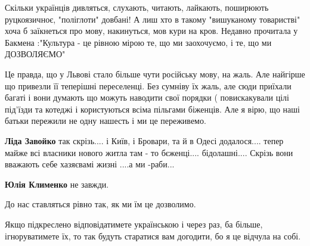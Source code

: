 \begin{itemize}
 

Скільки українців дивляться, слухають, читають, лайкають, поширюють
руцкоязичноє, "поліглоти" довбані! А лиш хто в такому "вишуканому товаристві"
хоча б заїкнеться про мову, накинуться, мов кури на кров. Недавно прочитала у
Бакмена :"Культура - це рівною мірою те, що ми заохочуємо, і те, що ми
ДОЗВОЛЯЄМО"

 

Це правда, що у Львові стало більше чути російську мову, на жаль. Але найгірше
що привезли її теперішні переселенці. Без сумніву їх жаль, але сюди приїхали
багаті і вони думають що можуть наводити свої порядки ( повискакували цілі
під'їзди та котеджі і користуються всіма пільгами біженців. Але я вірю, що наші
батьки пережили не одну нашесть і ми це переживемо.

\begin{itemize}
 
\textbf{Ліда Завойко} так скрізь.... і Київ, і Бровари, та й в Одесі
додалося.... тепер майже всі власники нового житла там - то
бєженці.... бідолашні.... Скрізь вони вважають себе хазяєвамі жизні ....а ми
-раби...

 
\textbf{Юлія Клименко} не завжди.

До нас ставляться рівно так, як ми їм це дозволимо.

Якщо підкреслено відповідатимете українською і через раз, ба більше,
ігноруватимете їх, то так будуть старатися вам догодити, бо я це відчула на
собі.


\end{itemize}
\end{itemize}
